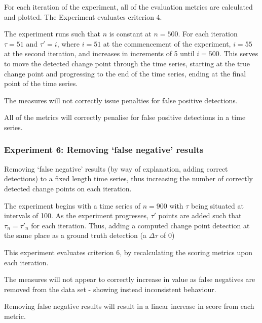 \documentclass[../main.tex]{subfiles}
\begin{document}
For each iteration of the experiment, all of the evaluation metrics are calculated and plotted. The Experiment evaluates criterion 4.

The experiment runs such that $n$ is constant at $n=500$. For each iteration $\tau = 51$ and $\tau' = i$, where $i = 51$ at the commencement of the experiment, $i=55$ at the second iteration, and increases in increments of 5 until $i = 500$. This serves to move the detected change point through the time series, starting at the true change point and progressing to the end of the time series, ending at the final point of the time series.

\begin{hypothesis}
    The measures will not correctly issue penalties for false positive detections.
\end{hypothesis}

\begin{nullhypothesis}
    All of the metrics will correctly penalise for false positive detections in a time series.
\end{nullhypothesis}

\subsubsection{Experiment 6: Removing `false negative' results}

Removing `false negative' results (by way of explanation, adding correct detections) to a fixed length time series, thus increasing the number of correctly detected change points on each iteration.

The experiment begins with a time series of $n=900$ with $\tau$ being situated at intervals of 100. As the experiment progresses, $\tau'$ points are added such that $\tau_n = \tau'_n$ for each iteration. Thus, adding a computed change point detection at the same place as a ground truth detection (a $\Delta \tau$ of 0)

This experiment evaluates criterion 6, by recalculating the scoring metrics upon each iteration.

\begin{hypothesis}
    The measures will not appear to correctly increase in value as false negatives are removed from the data set - showing instead inconsistent behaviour.
\end{hypothesis}

\begin{nullhypothesis}
    Removing false negative results will result in a linear increase in score from each metric.
\end{nullhypothesis}
\end{document}
